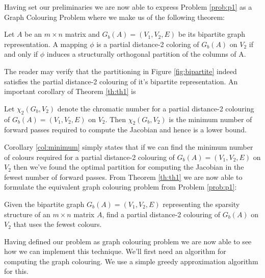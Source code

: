 	Having set our preliminaries we are now able to express Problem
	\ref{prob:p1} as a Graph Colouring Problem where  we make us of the following theorem:
	\begin{theorem}
		Let $A$ be an $m \times n$ matrix and $G_b(A) = (V_1, V_2, E)$ be its bipartite
		graph representation. A mapping $\phi$ is a partial distance-2 coloring of
		$G_b(A)$ on $V_2$ if and only if $\phi$ induces a structurally orthogonal
		partition of the columns of A.
		\label{th:th1}
	\end{theorem}
	The reader may verify that the partitioning in Figure \ref{fig:bipartite} indeed
	satisfies the partial distance-2 colouring of
	it's bipartite representation. An important corollary of Theorem \ref{th:th1} is

	\begin{corollary}
		Let $\chi_2(G_b, V_2)$ denote the chromatic number for a partial distance-2
		colouring of $G_b(A) = (V_1, V_2, E)$  on $V_2$.
		Then $\chi_2(G_b, V_2)$ is the minimum number of forward passes required to
		compute the Jacobian and hence is a lower bound.
		\label{col:minimum}
	\end{corollary}
	Corollary \ref{col:minimum} simply states that if we can find the minimum number
	of colours required for a partial distance-2 colouring of $G_b(A) = (V_1, V_2,
	E)$  on $V_2$  then we've found the optimal partition for computing the
	Jacobian in the fewest number of forward passes. From Theorem \ref{th:th1} we
	are now able to formulate the equivalent graph colouring problem from Problem
	\ref{prob:p1}:
	\begin{problem}
		Given the bipartite graph $G_b(A) = (V_1, V_2, E)$ representing the sparsity
		structure of an $m \times n$ matrix $A$, find a partial distance-2 colouring of
		$G_b(A)$ on $V_2$ that uses the fewest colours.
	\end{problem}
	Having defined our problem as graph colouring problem we are 
	now able to see how we can implement this technique. We'll first need 
	an algorithm for computing the graph colouring. We use a simple greedy approximation
	algorithm for this. 

